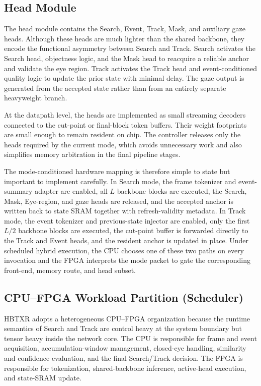 \documentclass[journal]{IEEEtran}
\begin{document}
\subsection{Head Module}
The head module contains the Search, Event, Track, Mask, and auxiliary gaze heads. Although these heads are much lighter than the shared backbone, they encode the functional asymmetry between Search and Track. Search activates the Search head, objectness logic, and the Mask head to reacquire a reliable anchor and validate the eye region. Track activates the Track head and event-conditioned quality logic to update the prior state with minimal delay. The gaze output is generated from the accepted state rather than from an entirely separate heavyweight branch.

At the datapath level, the heads are implemented as small streaming decoders connected to the cut-point or final-block token buffers. Their weight footprints are small enough to remain resident on chip. The controller releases only the heads required by the current mode, which avoids unnecessary work and also simplifies memory arbitration in the final pipeline stages.

The mode-conditioned hardware mapping is therefore simple to state but important to implement carefully. In Search mode, the frame tokenizer and event-summary adapter are enabled, all $L$ backbone blocks are executed, the Search, Mask, Eye-region, and gaze heads are released, and the accepted anchor is written back to state SRAM together with refresh-validity metadata. In Track mode, the event tokenizer and previous-state injector are enabled, only the first $L/2$ backbone blocks are executed, the cut-point buffer is forwarded directly to the Track and Event heads, and the resident anchor is updated in place. Under scheduled hybrid execution, the CPU chooses one of these two paths on every invocation and the FPGA interprets the mode packet to gate the corresponding front-end, memory route, and head subset.

\subsection{CPU--FPGA Workload Partition (Scheduler)}
HBTXR adopts a heterogeneous CPU--FPGA organization because the runtime semantics of Search and Track are control heavy at the system boundary but tensor heavy inside the network core. The CPU is responsible for frame and event acquisition, accumulation-window management, closed-eye handling, similarity and confidence evaluation, and the final Search/Track decision. The FPGA is responsible for tokenization, shared-backbone inference, active-head execution, and state-SRAM update.
\end{document}
